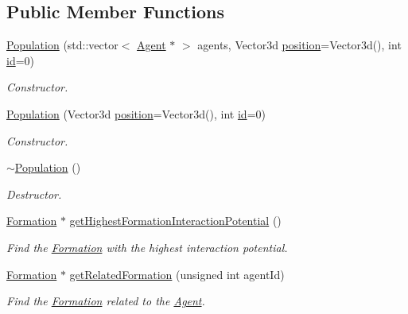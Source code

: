 \subsection*{Public Member Functions}
\begin{DoxyCompactItemize}
\item 
\hyperlink{classPopulation_a013e3f3d1a26f4ff64570ea91ae9cb22}{Population} (std\+::vector$<$ \hyperlink{classAgent}{Agent} $\ast$ $>$ agents, Vector3d \hyperlink{classLocalizedObject_a340834deefc9e5c39da1f26c4ebf4f8c}{position}=Vector3d(), int \hyperlink{classIdentifiedObject_ad044a317a9b573a3d1bcd025df166eb5}{id}=0)
\begin{DoxyCompactList}\small\item\em Constructor. \end{DoxyCompactList}\item 
\hyperlink{classPopulation_a3284afe8c0a8c10d7ce7a57c52f2f046}{Population} (Vector3d \hyperlink{classLocalizedObject_a340834deefc9e5c39da1f26c4ebf4f8c}{position}=Vector3d(), int \hyperlink{classIdentifiedObject_ad044a317a9b573a3d1bcd025df166eb5}{id}=0)
\begin{DoxyCompactList}\small\item\em Constructor. \end{DoxyCompactList}\item 
\hyperlink{classPopulation_a4c8cedd0f038e41746fb6084639f5616}{$\sim$\+Population} ()
\begin{DoxyCompactList}\small\item\em Destructor. \end{DoxyCompactList}\item 
\hyperlink{classFormation}{Formation} $\ast$ \hyperlink{classPopulation_aa39ee4e80d5cfd38a946395be1c49177}{get\+Highest\+Formation\+Interaction\+Potential} ()
\begin{DoxyCompactList}\small\item\em Find the \hyperlink{classFormation}{Formation} with the highest interaction potential. \end{DoxyCompactList}\item 
\hyperlink{classFormation}{Formation} $\ast$ \hyperlink{classPopulation_ad13aa87e5d1088faeca0071f8e3637d0}{get\+Related\+Formation} (unsigned int agent\+Id)
\begin{DoxyCompactList}\small\item\em Find the \hyperlink{classFormation}{Formation} related to the \hyperlink{classAgent}{Agent}. \end{DoxyCompactList}\item 

\end{DoxyCompactItemize}

